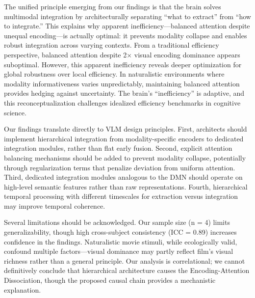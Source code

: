 \documentclass[10pt,letterpaper]{article}
\begin{document}
The unified principle emerging from our findings is that the brain solves multimodal integration by architecturally separating “what to extract” from “how to integrate.” This explains why apparent inefficiency—balanced attention despite unequal encoding—is actually optimal: it prevents modality collapse and enables robust integration across varying contexts. From a traditional efficiency perspective, balanced attention despite 2× visual encoding dominance appears suboptimal. However, this apparent inefficiency reveals deeper optimization for global robustness over local efficiency. In naturalistic environments where modality informativeness varies unpredictably, maintaining balanced attention provides hedging against uncertainty. The brain’s “inefficiency” is adaptive, and this reconceptualization challenges idealized efficiency benchmarks in cognitive science.

Our findings translate directly to VLM design principles. First, architects should implement hierarchical integration from modality-specific encoders to dedicated integration modules, rather than flat early fusion. Second, explicit attention balancing mechanisms should be added to prevent modality collapse, potentially through regularization terms that penalize deviation from uniform attention. Third, dedicated integration modules analogous to the DMN should operate on high-level semantic features rather than raw representations. Fourth, hierarchical temporal processing with different timescales for extraction versus integration may improve temporal coherence.

Several limitations should be acknowledged. Our sample size (n = 4) limits generalizability, though high cross-subject consistency (ICC = 0.89) increases confidence in the findings. Naturalistic movie stimuli, while ecologically valid, confound multiple factors—visual dominance may partly reflect film's visual richness rather than a general principle. Our analysis is correlational; we cannot definitively conclude that hierarchical architecture causes the Encoding-Attention Dissociation, though the proposed causal chain provides a mechanistic explanation.
\end{document}
